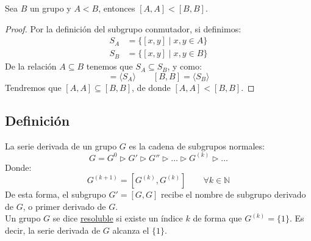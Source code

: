 \begin{lema}\label{lema:resolubles}
    Sea $B$ un grupo y $A<B$, entonces $[A,A] < [B,B]$.
    \begin{proof}
        Por la definición del subgrupo conmutador, si definimos:
        \begin{align*}
            S_A &= \{[x,y] \mid x,y\in A\} \\
            S_B &= \{[x,y] \mid x,y\in B\} 
        \end{align*}
        De la relación $A\subseteq B$ tenemos que $S_A\subseteq S_B$, y como:
        \begin{equation*}
            [A,A] = \langle S_A \rangle  \qquad [B,B] = \langle S_B \rangle 
        \end{equation*}
        Tendremos que $[A,A]\subseteq [B,B]$, de donde $[A,A] < [B,B]$.
    \end{proof}
\end{lema}

\subsection{Definición}
\begin{definicion}
    La serie derivada de un grupo $G$ es la cadena de subgrupos normales:
    \begin{equation*}
        G = G^0 \rhd G' \rhd G'' \rhd \ldots \rhd G^{(k)} \rhd \ldots
    \end{equation*}
    Donde:
    \begin{equation*}
        G^{(k+1)} = [G^{(k)}, G^{(k)}] \qquad \forall k\in \mathbb{N}
    \end{equation*}
    De esta forma, el subgrupo $G' = [G,G]$ recibe el nombre de subgrupo derivado de $G$, o primer derivado de $G$.\\

    \noindent
    Un grupo $G$ se dice \underline{resoluble} si existe un índice $k$ de forma que $G^{(k)} = \{1\}$. Es decir, la serie derivada de $G$ alcanza el $\{1\}$.
\end{definicion}


